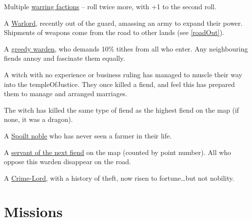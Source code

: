 \begin{multicols}{2}
\begin{dlist}
  \item
  Multiple \underline{warring factions} -- roll twice more, with +1 to the second roll.
  \item
  A \underline{Warlord}, recently out of the \gls{guard}, amassing an army to expand their power.
  Shipments of weapons come from the road to other lands
  (see \vref{roadOut}).
  \item
  A \underline{greedy \gls{warden}}, who demands 10\% tithes from all who enter.
  Any neighbouring fiends annoy and fascinate them equally.
  \item
  A \gls{witch} with no experience or business ruling has managed to muscle their way into the \gls{templeOfJustice}.
  They once killed a fiend, and feel this has prepared them to manage  and arranged marriages.

  The \gls{witch} has killed the same type of fiend as the highest fiend on the map (if none, it was a dragon).
  \item
  A \underline{Spoilt noble} who has never seen a farmer in their life.
  \item
  A \underline{servant of the next fiend} on the map (counted by point number).
  All who oppose this \gls{warden} disappear on the road.
  \item
  A \underline{Crime-Lord}, with a history of theft, now risen to fortune\ldots but not nobility.
\end{dlist}

\end{multicols}

\encTownEvents

\section{Missions}
\label{NGmissions}

